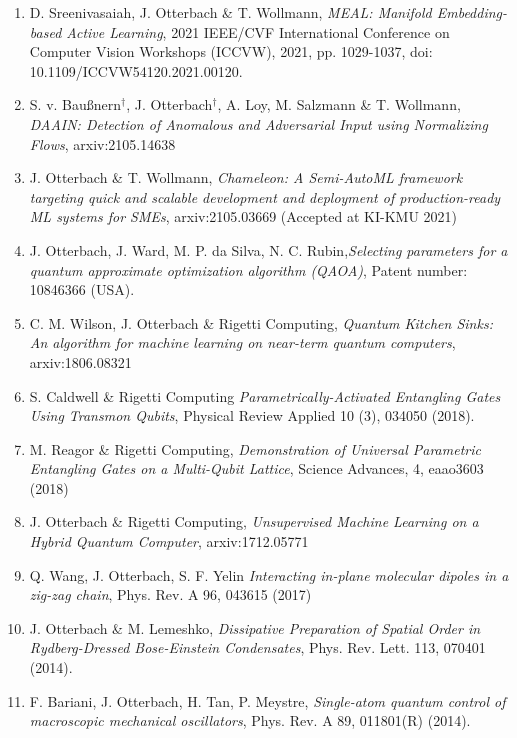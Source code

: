 \documentclass[10pt,centered]{./res} %
\begin{document}
\begin{resume}
\begin{enumerate}
  \item D. Sreenivasaiah, J. Otterbach \& T. Wollmann, \textit{MEAL: Manifold Embedding-based Active Learning}, 2021 IEEE/CVF International Conference on Computer Vision Workshops (ICCVW), 2021, pp. 1029-1037, doi: 10.1109/ICCVW54120.2021.00120.

  \item S. v. Baußnern$^\dagger$, J. Otterbach$^\dagger$, A. Loy, M. Salzmann \& T. Wollmann, \textit{DAAIN: Detection of Anomalous and Adversarial Input using Normalizing Flows}, arxiv:2105.14638

  \item J. Otterbach \& T. Wollmann, \textit{Chameleon: A Semi-AutoML framework targeting quick and scalable development and deployment of production-ready ML systems for SMEs}, arxiv:2105.03669 (Accepted at KI-KMU 2021)

  \item J. Otterbach, J. Ward, M. P. da Silva, N. C. Rubin,\textit{Selecting parameters for a quantum approximate optimization algorithm (QAOA)}, Patent number: 10846366 (USA).

  \item C. M. Wilson, J. Otterbach \& Rigetti Computing, \textit{Quantum Kitchen Sinks: An algorithm for machine learning on near-term quantum computers}, arxiv:1806.08321

  \item S. Caldwell \& Rigetti Computing \textit{Parametrically-Activated Entangling Gates Using Transmon Qubits}, Physical Review Applied 10 (3), 034050 (2018).

  \item M. Reagor \& Rigetti Computing, \textit{Demonstration of Universal Parametric Entangling Gates on a Multi-Qubit Lattice}, Science Advances, 4, eaao3603 (2018)

  \item J. Otterbach \& Rigetti Computing, \textit{Unsupervised Machine Learning on a Hybrid Quantum Computer}, arxiv:1712.05771

  \item Q. Wang, J. Otterbach, S. F. Yelin \textit{Interacting in-plane molecular dipoles in a zig-zag chain}, Phys. Rev. A 96, 043615 (2017)

  \item J. Otterbach \& M. Lemeshko, \textit{Dissipative Preparation of Spatial Order in Rydberg-Dressed Bose-Einstein Condensates}, Phys. Rev. Lett. 113, 070401 (2014).

  \item F. Bariani, J. Otterbach, H. Tan, P. Meystre, \textit{Single-atom quantum control of macroscopic mechanical oscillators}, Phys. Rev. A 89, 011801(R) (2014).


\end{enumerate}
\end{resume}
\end{document}
